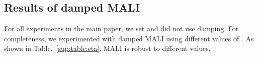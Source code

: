 \documentclass{article} \usepackage{iclr2021_conference,times}
\begin{document}
\subsection{Results of damped MALI }
For all experiments in the main paper, we set  and did not use damping. For completeness, we experimented with damped MALI using different values of . As shown in Table.~\ref{sup:table:eta}, MALI is robust to different  values.
\begin{table}[]
\caption{Results of damped MALI with different  values. We report the test accuracy of Neural CDE on Speech Command dataset, and the test MSE of latent-ODE on Mujoco data.}
\label{sup:table:eta}
\end{table}
\end{document}
